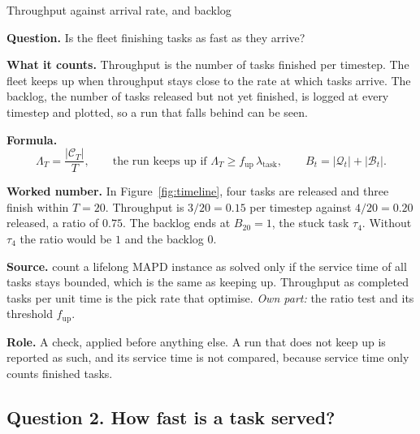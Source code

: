 \documentclass[11pt,a4paper]{article}
\newcommand{\row}[1]{\par\smallskip\noindent\textbf{#1}\enspace}
\begin{document}
\begin{card}{Throughput against arrival rate, and backlog}
\row{Question.} Is the fleet finishing tasks as fast as they arrive?

\row{What it counts.} Throughput is the number of tasks finished per
timestep. The fleet keeps up when throughput stays close to the rate at
which tasks arrive. The backlog, the number of tasks released but not yet
finished, is logged at every timestep and plotted, so a run that falls
behind can be seen.

\row{Formula.}
\[
  \Lambda_T = \frac{|\mathcal{C}_T|}{T}, \qquad
  \text{the run keeps up if } \Lambda_T \ge f_{\mathrm{up}}\,\lambda_{\mathrm{task}},
  \qquad B_t = |\mathcal{Q}_t| + |\mathcal{B}_t| .
\]

\row{Worked number.} In Figure~\ref{fig:timeline}, four tasks are
released and three finish within $T=20$. Throughput is $3/20 = 0.15$ per
timestep against $4/20 = 0.20$ released, a ratio of $0.75$. The backlog
ends at $B_{20} = 1$, the stuck task $\tau_4$. Without $\tau_4$ the ratio
would be $1$ and the backlog $0$.

\row{Source.} \citet{ma2017lifelong_mapf} count a lifelong MAPD instance
as solved only if the service time of all tasks stays bounded, which is
the same as keeping up. Throughput as completed tasks per unit time is the
pick rate that \citet{krnjaic2022warehouse_marl} optimise. \emph{Own
part:} the ratio test and its threshold $f_{\mathrm{up}}$.

\row{Role.} A check, applied before anything else. A run that does not
keep up is reported as such, and its service time is not compared,
because service time only counts finished tasks.
\end{card}

\subsection{Question 2. How fast is a task served?}
\end{document}
